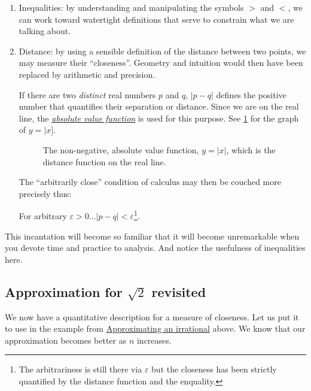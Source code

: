 \documentclass[
  a4paper,
]{article}
\begin{document}
\begin{enumerate}
\def\labelenumi{\alph{enumi}.}
\item
  Inequalities: by understanding and manipulating the symbols \(>\) and
  \(<\), we can work toward watertight definitions that serve to
  constrain what we are talking about.
\item
  Distance: by using a sensible definition of the distance between two
  points, we may measure their ``closeness''. Geometry and intuition
  would then have been replaced by arithmetic and precision.

  If there are two \emph{distinct} real numbers \(p\) and \(q\),
  \(|p - q|\) defines the positive number that quantifies their
  separation or distance. Since we are on the real line, the
  \href{https://mathworld.wolfram.com/AbsoluteValue.html}{\emph{absolute
  value function}} is used for this purpose. See \cref{fig:absolute} for
  the graph of \(y = |x]\).

  \begin{figure}
  \centering
  
  \caption{The non-negative, absolute value function, \(y = |x|\), which
  is the distance function on the real line.}\label{fig:absolute}
  \end{figure}

  The ``arbitrarily close'' condition of calculus may then be couched
  more precisely thus:

  For arbitrary
  \(\varepsilon > 0 \dots | p - q | < \varepsilon\)\footnote{The
    arbitrariness is still there via \(\varepsilon\) but the closeness
    has been strictly quantified by the distance function and the
    enquality.}.
\end{enumerate}

This incantation will become so familiar that it will become
unremarkable when you devote time and practice to analysis. And notice
the usefulness of inequalities here.

\subsection{\texorpdfstring{Approximation for \(\sqrt{2}\)
revisited}{Approximation for \textbackslash sqrt\{2\} revisited}}\label{approximation-for-sqrt2-revisited}

We now have a quantitative description for a measure of closeness. Let
us put it to use in the example from
\hyperref[approximating-an-irrational]{Approximating an irrational}
above. We know that our approximation becomes better as \(n\) increases.
\end{document}
